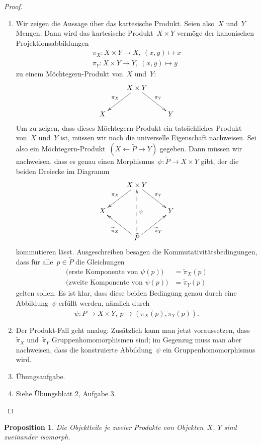 \documentclass[a4paper,ngerman]{scrartcl}
\theoremstyle{definition}
\theoremstyle{plain}
\newtheorem{prop}[defn]{Proposition}
\theoremstyle{remark}
\begin{document}
\begin{proof}
\begin{enumerate}
\item Wir zeigen die Aussage über das kartesische Produkt. Seien also~$X$
und~$Y$ Mengen. Dann wird das kartesische Produkt~$X \times Y$ vermöge der
kanonischen Projektionsabbildungen
\begin{align*}
  \pi_X : X \times Y \to X,\ (x,y) \mapsto x \\
  \pi_Y : X \times Y \to Y,\ (x,y) \mapsto y
\end{align*}
zu einem Möchtegern-Produkt von~$X$ und~$Y$:
\[ \xymatrix{
  & X \times Y \ar[ld]_{\pi_X} \ar[rd]^{\pi_Y} \\
  X & & Y
} \]
Um zu zeigen, dass dieses Möchtegern-Produkt ein tatsächliches Produkt von~$X$
und~$Y$ ist, müssen wir noch die universelle Eigenschaft nachweisen. Sei also
ein Möchtegern-Produkt~$(X \leftarrow \widetilde P \to Y)$ gegeben. Dann müssen
wir nachweisen, dass es genau einen Morphismus~$\psi:\widetilde P \to X \times
Y$ gibt, der die beiden Dreiecke im Diagramm
\[ \xymatrix{
    & X \times Y \ar[ld]_{\pi_X} \ar[rd]^{\pi_Y} \\
  X & & Y \\
    & \widetilde P \ar[lu]^{\widetilde \pi_X} \ar@{-->}[uu]_\psi \ar[ru]_{\widetilde \pi_Y}
  } \]
kommutieren lässt. Ausgeschreiben besagen die Kommutativitätsbedingungen, dass
für alle~$p \in \widetilde P$ die Gleichungen
\begin{align*}
  \text{(erste Komponente von $\psi(p)$)} &= \widetilde \pi_X(p) \\
  \text{(zweite Komponente von $\psi(p)$)} &= \widetilde \pi_Y(p)
\end{align*}
gelten sollen.
Es ist klar, dass diese beiden Bedingung genau durch eine Abbildung~$\psi$
erfüllt werden, nämlich durch
\[ \psi : \widetilde P \to X \times Y,\ p \mapsto (\widetilde \pi_X(p),
\widetilde \pi_Y(p)). \]
\item Der Produkt-Fall geht analog: Zusätzlich kann man jetzt voraussetzen,
dass~$\widetilde \pi_X$ und~$\widetilde \pi_Y$ Gruppenhomomorphismen sind; im
Gegenzug muss man aber nachweisen, dass die konstruierte Abbildung~$\psi$ ein
Gruppenhomomorphismus wird.
\item Übungsaufgabe.
\item Siehe Übungsblatt 2, Aufgabe 3. \qedhere
\end{enumerate}
\end{proof}

\begin{prop}Die Objektteile je zweier Produkte von Objekten~$X$, $Y$ sind
zueinander isomorph.\end{prop}
\end{document}
